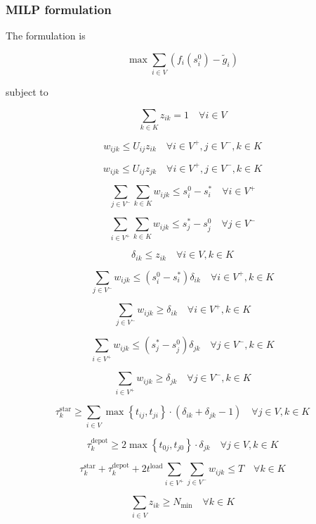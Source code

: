 \documentclass[11pt]{article}
\numberwithin{table}{section}
\numberwithin{figure}{section}
\begin{document}
\subsubsection{MILP formulation}

The formulation is

\[
\max \sum\limits_{i\in V}{\left( {{f}_{i}}(s_{i}^{0})-{{{\tilde{g}}}_{i}} \right)}
\]

subject to

\[
\sum\limits_{k\in K}{{{z}_{ik}}}=1\quad \forall i\in V
\]

\[
{{w}_{ijk}}\le {{U}_{ij}}{{z}_{ik}}\quad \forall i\in {{V}^{+}},j\in {{V}^{-}},k\in K
\]

\[
{{w}_{ijk}}\le {{U}_{ij}}{{z}_{jk}}\quad \forall i\in {{V}^{+}},j\in {{V}^{-}},k\in K
\]

\[
\sum\limits_{j\in {{V}^{-}}}{\sum\limits_{k\in K}{{{w}_{ijk}}}}\le s_{i}^{0}-s_{i}^{*}\quad \forall i\in {{V}^{+}}
\]

\[
\sum\limits_{i\in {{V}^{+}}}{\sum\limits_{k\in K}{{{w}_{ijk}}}}\le s_{j}^{*}-s_{j}^{0}\quad \forall j\in {{V}^{-}}
\]

\[
{{\delta }_{ik}}\le {{z}_{ik}}\quad \forall i\in V,k\in K
\]

\[
\sum\limits_{j\in {{V}^{-}}}{{{w}_{ijk}}}\le \left( s_{i}^{0}-s_{i}^{*} \right){{\delta }_{ik}}\quad \forall i\in {{V}^{+}},k\in K
\]

\[
\sum\limits_{j\in {{V}^{-}}}{{{w}_{ijk}}}\ge {{\delta }_{ik}}\quad \forall i\in {{V}^{+}},k\in K
\]

\[
\sum\limits_{i\in {{V}^{+}}}{{{w}_{ijk}}}\le \left( s_{j}^{*}-s_{j}^{0} \right){{\delta }_{jk}}\quad \forall j\in {{V}^{-}},k\in K
\]

\[
\sum\limits_{i\in {{V}^{+}}}{{{w}_{ijk}}}\ge {{\delta }_{jk}}\quad \forall j\in {{V}^{-}},k\in K
\]

\[
\tau _{k}^{\text{star}}\ge \sum\limits_{i\in V}{\max \left\{ {{t}_{ij}},{{t}_{ji}} \right\}}\cdot \left( {{\delta }_{ik}}+{{\delta }_{jk}}-1 \right)\quad \forall j\in V,k\in K
\]

\[
\tau _{k}^{\text{depot}}\ge 2\max \left\{ {{t}_{0j}},{{t}_{j0}} \right\}\cdot {{\delta }_{jk}}\quad \forall j\in V,k\in K
\]

\[
\tau _{k}^{\text{star}}+\tau _{k}^{\text{depot}}+2{{t}^{\text{load}}}\sum\limits_{i\in {{V}^{+}}}{\sum\limits_{j\in {{V}^{-}}}{{{w}_{ijk}}}}\le T\quad \forall k\in K
\]

\[
\sum\limits_{i\in V}{{{z}_{ik}}}\ge {{N}_{\min }}\quad \forall k\in K
\]
\end{document}
